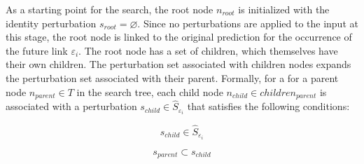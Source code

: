 
As a starting point for the search, the root node $n_{root}$ is initialized with the identity perturbation $s_{root} = \varnothing$. Since no perturbations are applied to the input at this stage, the root node is linked to the original prediction for the occurrence of the future link $\varepsilon_i$.
The root node has a set of children, which themselves have their own children. The perturbation set associated with children nodes expands the perturbation set associated with their parent. Formally, for a for a parent node $n_{parent} \in T$ in the search tree, each child node $n_{child} \in children_{parent}$ is associated with a perturbation $s_{child} \in \hat{S}_{\varepsilon_i}$ that satisfies the following conditions:

\begin{equation}
    \label{e_child_1}
    s_{child} \in \hat{S}_{\varepsilon_i}
\end{equation}

\begin{equation}
    \label{e_child_2}
    s_{parent} \subset s_{child}
\end{equation}

